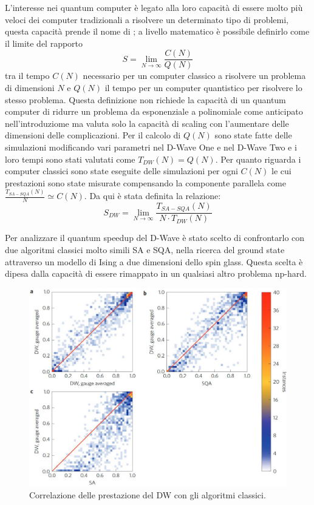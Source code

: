 
L'interesse nei quantum computer è legato alla loro capacità di essere molto più veloci dei computer tradizionali a risolvere un determinato tipo di problemi, questa capacità prende il nome di ; a livello matematico è possibile definirlo\cite{DDQS} come il limite del rapporto
$$S = \lim_{N \to \infty} \frac{C(N)}{Q(N)}$$
tra il tempo $C(N)$ necessario per un computer classico a risolvere un problema di dimensioni $N$ e $Q(N)$ il tempo per un computer quantistico per risolvere lo stesso problema. Questa definizione non richiede la capacità di un quantum computer di ridurre un problema da esponenziale a polinomiale come anticipato nell'introduziome ma valuta solo la capacità di scaling con l'aumentare delle dimensioni delle complicazioni.
Per il calcolo di $Q(N)$ sono state fatte delle simulazioni modificando vari parametri nel D-Wave One e nel D-Wave Two e i loro tempi sono stati valutati come $T_{DW}(N) = Q(N)$. Per quanto riguarda i computer classici sono state eseguite delle simulazioni per ogni $C(N)$ le cui prestazioni sono state misurate compensando la componente parallela\cite{EQA} come
 $\frac{T_{SA-SQA}(N)}{N} \simeq C(N)$. Da qui è stata definita\cite{DDQS} la relazione:
$$S_{DW} = \lim_{N \to \infty} \frac{T_{SA-SQA}(N)}{N \cdot T_{DW}(N)}$$


\cite{EQA}Per analizzare il quantum speedup del D-Wave è stato scelto di confrontarlo con due algoritmi classici molto simili SA e SQA, nella ricerca del ground state attraverso un modello di Ising a due dimensioni dello spin glass.
Questa scelta è dipesa dalla capacità di essere rimappato in un qualsiasi altro problema np-hard.

\begin{figure}[htbp]
  \centering
  \includegraphics[scale=0.5]{Immagini/correlazione-2-dw.jpg}
  \caption{Correlazione delle prestazione del DW con gli algoritmi classici.}
  \label{figura:correlazione-2-dw}
\end{figure}

